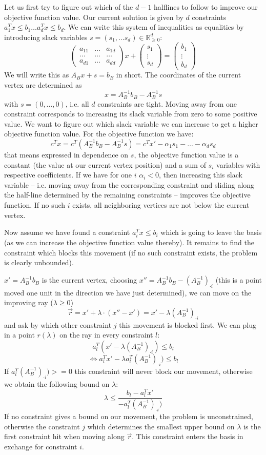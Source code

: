 \documentclass{article}
\newcommand{\setR}{\mathbb{R}}
\newcommand{\mat}[1]{ \begin{pmatrix} #1 \end{pmatrix}}
\begin{document}
Let us first try to figure out which of the $d-1$ halflines to follow to improve our objective function value.
Our current solution is given by $d$ constraints $a_1^Tx\leq b_1 \dots a_d^Tx \leq b_d$. We can write
this system of inequalities as equalities by introducing slack variables $s=(s_1,\dots s_d)\in \setR^d_{\geq0}$:
\[
	\mat{a_{11} & \dots & a_{1d} \\ \dots & \dots & \dots \\ a_{d1} & \dots & a_{dd}} x 
		+ \mat{s_1\\ \vdots \\ s_d} = \mat{b_1\\ \vdots \\ b_d}
\]
We will write this as $A_B x + s = b_B$ in short. The coordinates of the current vertex are determined as 
\[
	x=A_B^{-1}b_B - A_B^{-1}s	
\]
with $s=(0,\dots,0)$, i.e. all $d$ constraints are tight. Moving away from one constraint corresponds to 
increasing its slack variable from zero to some positive value. We want to figure out which slack variable
we can increase to get a higher objective function value. For the objective function we have:
\[
	c^Tx= c^T(A_B^{-1}b_B - A_B^{-1}s)= c^T x' - \alpha_1 s_1 - \dots - \alpha_d s_d
\]
that means expressed in dependence on $s$, the objective function value is a constant (the value at our current
vertex position) and a sum of $s_i$ variables with respective coefficients. If we have for one $i$ 
$\alpha_i<0$, then increasing this slack variable -- i.e. moving away from the corresponding constraint and
sliding along the half-line determined by the remaining constraints -- improves the objective function.
If no such $i$ exists, all neighboring vertices are not below the current vertex.

Now assume we have found a constraint $a_i^T x \leq b_i$
which is going to leave the basis (as we can increase the objective function value thereby). 
It remains to find the constraint which
blocks this movement (if no such constraint exists, the problem is clearly unbounded).

$x'=A_B^{-1}b_B$ is the current vertex, choosing $x''=A_B^{-1}b_B - (A_B^{-1})_{\cdot i}$ (this is a point moved
one unit in the direction we have just determined), we can move 
on the improving ray  ($\lambda\geq 0$)
\[
	\overrightarrow{r}=x' + \lambda \cdot {(x''-x')}
			= x' - \lambda (A_B^{-1})_{\cdot i}
\]
and ask by which other constraint $j$ this movement is blocked first.
We can plug in a point $r(\lambda)$ on the ray in every constraint $l$:
\[
	a_l^{T}(x'-\lambda (A_B^{-1})_{\cdot i})\leq b_l
\]
\[
\Leftrightarrow	a_l^{T}x'-\lambda a_l^{T}(A_B^{-1})_{\cdot i})\leq b_l
\]
If $a_l^{T}(A_B^{-1})_{\cdot i})>=0$ this constraint will never block our movement, otherwise
we obtain the following bound on $\lambda$:
\[
	\lambda \leq \frac{b_l - a_l^{T}x'}{-a_l^{T}(A_B^{-1})_{\cdot i})}
\]
If no constraint gives a bound on our movement, the problem is unconstrained, otherwise the constraint $j$
which determines the smallest upper bound on $\lambda$ is the first constraint hit when moving along
$\overrightarrow{r}$. This constraint enters the basis in exchange for constraint $i$.
\end{document}
